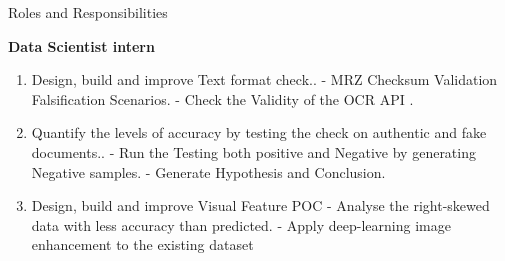 \documentclass[aspectratio=169,xcolor=dvipsnames]{beamer}
\begin{document}

\begin{frame}{Roles and Responsibilities }
    \tableofcontents

    \textbf{Data Scientist intern}
    \begin{enumerate}
        \item Design, build and improve Text format check..\break 
            - MRZ Checksum Validation Falsification Scenarios.\break 
            - Check the Validity of the OCR API .\break
            
         \item  Quantify the levels of accuracy by testing the check on authentic and fake documents..\break 
            - Run the Testing both positive and Negative by generating Negative samples.\break 
            - Generate Hypothesis and Conclusion.\break
            
        \item Design, build and improve Visual Feature POC\break 
            - Analyse the right-skewed data with less accuracy than predicted.\break 
            - Apply deep-learning image enhancement to the existing dataset\break
        \end{enumerate}
\end{frame}



\end{document}
